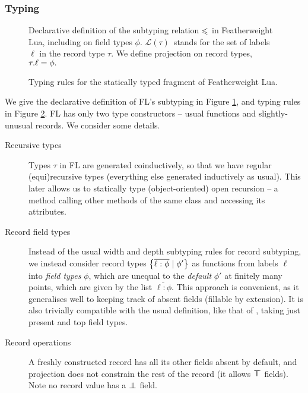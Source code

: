 \subsubsection{Typing}

\begin{figure}
    \centering
    
    \caption{Declarative definition of the subtyping relation $\leqslant$ in Featherweight Lua, including on field types $\phi$. $\mathcal L(\tau)$~stands for the set of labels $\ell$ in the record type $\tau$. We define projection on record types,~${\tau}{.}{\ell} = \phi.$}
    \label{fig:featherweight-lua-subtyping}
\end{figure}

\begin{figure}
    
    \caption{Typing rules for the statically typed fragment of Featherweight Lua.}
    \label{fig:featherweight-lua-typing}
\end{figure}

We give the declarative definition of FL's subtyping in Figure \ref{fig:featherweight-lua-subtyping}, and typing rules in Figure \ref{fig:featherweight-lua-typing}.
FL has only two type constructors -- usual functions and slightly-unusual records. We consider some details.

\begin{description}
    \item[Recursive types] Types $\tau$ in FL are generated coinductively, so that we have regular (equi)recursive types (everything else generated inductively as usual). This later allows us to statically type (object-oriented) open recursion -- a method calling other methods of the same class and accessing its attributes.
    \item[Record field types] Instead of the usual width and depth subtyping rules for record subtyping, we instead consider record types $\flrec{\overline{\ell : \phi} \mid \phi'}$ as functions from labels $\ell$ into \emph{field types} $\phi$, which are unequal to the \emph{default} $\phi'$ at finitely many points, which are given by the list $\overline{\ell : \phi}$. This approach is convenient, as it generalises well to keeping track of absent fields (fillable by extension). It is also trivially compatible with the usual definition, like that of \textcite{tapl}, taking just present and top field types.
    \item[Record operations] A freshly constructed record has all its other fields absent by default, and projection does not constrain the rest of the record (it allows $\top \!\!\!\! \top$ fields). Note no record value has a $\bot \!\!\!\! \bot$ field.
\end{description}


